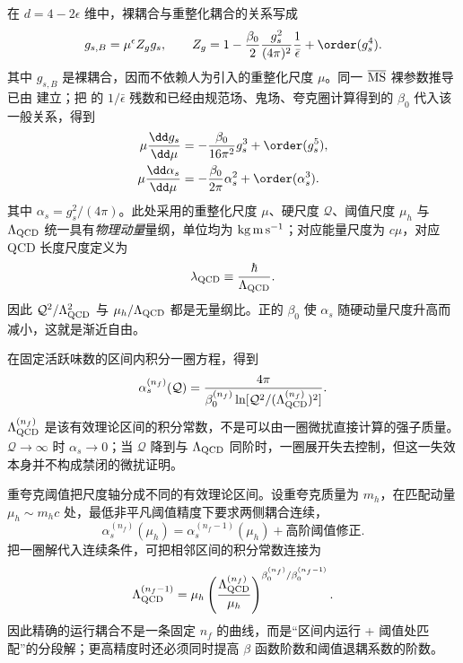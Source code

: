 在 $d=4-2\epsilon$ 维中，裸耦合与重整化耦合的关系写成
\begin{equation}
 {
 g_{s,B}=\mu^\epsilon Z_g g_s,
 \qquad
 Z_g=1-\frac{\beta_0}{2}
 \frac{g_s^2}{(4\pi)^2}\frac{1}{\bar\epsilon}
 +\order(g_s^4).}
 \label{eq:qcd-bare-coupling-msbar-dp68}
\end{equation}
其中 $g_{s,B}$ 是裸耦合，因而不依赖人为引入的重整化尺度 $\mu$。同一 $\overline{\rm MS}$ 裸参数推导已由 建立；把 的 $1/\bar\epsilon$ 残数和已经由规范场、鬼场、夸克圈计算得到的 $\beta_0$ 代入该一般关系，得到
\begin{equation}
 {\begin{aligned}
 \mu\frac{\dd g_s}{\dd\mu}
 &=-\frac{\beta_0}{16\pi^2}g_s^3+\order(g_s^5),\\
 \mu\frac{\dd\alpha_s}{\dd\mu}
 &=-\frac{\beta_0}{2\pi}\alpha_s^2+\order(\alpha_s^3).
 \end{aligned}}
 \label{eq:qcd-beta-alpha-one-loop-dp10}
\end{equation}
其中 $\alpha_s=g_s^2/(4\pi)$。此处采用的重整化尺度 $\mu$、硬尺度 $\mathcal Q$、阈值尺度 $\mu_h$ 与 $\Lambda_{\rm QCD}$ 统一具有\emph{物理动量}量纲，单位均为 ${\rm kg\,m\,s^{-1}}$；对应能量尺度为 $c\mu$，对应 QCD 长度尺度定义为
\begin{equation*}
 \lambda_{\rm QCD}\equiv\frac{\hbar}{\Lambda_{\rm QCD}}.
\end{equation*}
因此 $\mathcal Q^2/\Lambda_{\rm QCD}^2$ 与 $\mu_h/\Lambda_{\rm QCD}$ 都是无量纲比。正的 $\beta_0$ 使 $\alpha_s$ 随硬动量尺度升高而减小，这就是渐近自由。

在固定活跃味数的区间内积分一圈方程，得到
\begin{equation}
 {
 \alpha_s^{(n_f)}(\mathcal Q)
 =\frac{4\pi}
 {\beta_0^{(n_f)}\ln[\mathcal Q^2/(\Lambda_{\rm QCD}^{(n_f)})^2]}.}
 \label{eq:qcd-alpha-lambda-one-loop-dp10}
\end{equation}
$\Lambda_{\rm QCD}^{(n_f)}$ 是该有效理论区间的积分常数，不是可以由一圈微扰直接计算的强子质量。$\mathcal Q\to\infty$ 时 $\alpha_s\to0$；当 $\mathcal Q$ 降到与 $\Lambda_{\rm QCD}$ 同阶时，一圈展开失去控制，但这一失效本身并不构成禁闭的微扰证明。

重夸克阈值把尺度轴分成不同的有效理论区间。设重夸克质量为 $m_h$，在匹配动量 $\mu_h\sim m_hc$ 处，最低非平凡阈值精度下要求两侧耦合连续，
\begin{equation}
 {
 \alpha_s^{(n_f)}(\mu_h)
 =\alpha_s^{(n_f-1)}(\mu_h)
 +\text{高阶阈值修正}.}
 \label{eq:qcd-threshold-matching-alpha-dp32}
\end{equation}
把一圈解代入连续条件，可把相邻区间的积分常数连接为
\begin{equation}
 {
 \Lambda_{\rm QCD}^{(n_f-1)}
 =\mu_h
 \left(
 \frac{\Lambda_{\rm QCD}^{(n_f)}}{\mu_h}
 \right)^{\beta_0^{(n_f)}/\beta_0^{(n_f-1)}}.}
 \label{eq:qcd-threshold-lambda-dp32}
\end{equation}
因此精确的运行耦合不是一条固定 $n_f$ 的曲线，而是“区间内运行 + 阈值处匹配”的分段解；更高精度时还必须同时提高 $\beta$ 函数阶数和阈值退耦系数的阶数。

